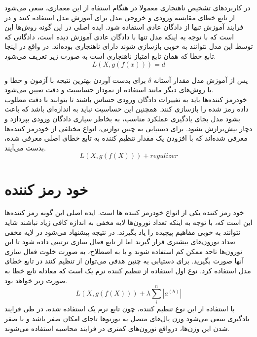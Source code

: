 \documentclass[12pt,a4paper]{report}
\theoremstyle{definition}
\theoremstyle{definition}
\begin{document}
در کاربردهای تشخیص ناهنجاری معمولا در هنگام استفاه از این معماری، سعی می‌شود از تابع خطای مقایسه ورودی و خروجی مدل برای آموزش مدل استفاده کنند و در فرایند آموزش تنها از دادگان عادی استفاده شود. ایده اصلی در این گونه روش‌ها این است که با توجه به اینکه مدل تنها با دادگان عادی آموزش دیده است، دادگانی که توسط این مدل نتوانند به خوبی بازسازی شوند دارای ناهنجاری بوده‌اند. در واقع در اینجا تابع خطا که همان تابع امتیاز ناهنجاری است به صورت زیر تعریف می‌شود.
\begin{equation}
	L(X, g(f(x))) = d
\end{equation}

پس از آموزش مدل مقدار آستانه $\delta$ برای بدست آوردن بهترین نتیجه با آزمون و خطا و یا روش‌های دیگر مانند استفاده از نمودار حساسیت و دقت تعیین می‌شود. \\

خودرمز کننده‌ها باید به تغییرات دادگان ورودی حساس باشند تا بتوانند با دقت مطلوب داده رمز شده را بازسازی کنند. همچنین این حساسیت نباید به اندازه‌ای باشد که باعث بشود مدل بجای یادگیری عملکرد مناسب، به بخاطر سپاری دادگان ورودی بپردازد و دچار بیش‌برازش بشود. برای دستیابی به چنین توازنی، انواع مختلفی از خودرمز کننده‌ها معرفی شده‌اند که با افزودن یک مقدار تنظیم کننده به تابع خطای اصلی معرفی شده، بدست می‌آیند.
\begin{equation}
	L(X, g(f(X))) + regulizer
\end{equation}

\section{خود رمز کننده }
خود رمز کننده  یکی از انواع خودرمز کننده ها است. ایده اصلی این گونه رمز کننده‌ها این است که، با توجه به اینکه تعداد نورون‌ها لایه مخفی به اندازه کافی زیاد نباشند شاید نتوانند به خوبی مفاهیم پیچیده را یاد بگیرند. در نتیجه پیشنهاد می‌شود در لایه مخفی تعداد نورون‌های بیشتری قرار گیرند اما از تابع فعال سازی ترتیبی داده شود تا این نورون‌ها تاحد ممکن کم استفاده شوند و یا به اصطلاح، به صورت خلوت فعال سازی آنها صورت بگیرید. برای دستیابی به چنین هدفی می‌توان از تنظیم کنند در تابع خطای مدل استفاده کرد. نوع اول استفاده از تنظیم کننده نرم یک است که معادله تابع خطا به صورت زیر خواهد بود.
\begin{equation}
L(X, g(f(X))) + \lambda \sum_{i}^{n}|a^{(h)}|
\end{equation}
با استفاده از این نوع تنظیم کننده، چون تابع نرم یک استفاده شده، در طی فرایند یادگیری سعی می‌شود وزن یال‌های متصل به نورنو‌ها تاجای امکان صفر باشد و با صفر شدن این وزن‌ها، درواقع نورون‌های کمتری در فرایند محاسبه استفاده می‌شوند. 
\end{document}
